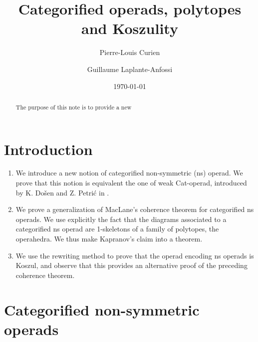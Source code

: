 \documentclass[10pt]{amsart}
\title{Categorified operads, polytopes and Koszulity}
\author{Pierre-Louis Curien}
\author{Guillaume Laplante-Anfossi}
\date{\today}
\theoremstyle{definition}
\theoremstyle{remark}
\numberwithin{equation}{section}
\newcommand{\0}{\color{blue}{\mathsf{0}}}
\begin{document}
\begin{abstract}
The purpose of this note is to provide a new 
\end{abstract}


\maketitle

\section{Introduction}

\begin{enumerate}
    \item We introduce a new notion of categorified non-symmetric (ns) operad. We prove that this notion is equivalent the one of weak Cat-operad, introduced by K. Do{\v s}en and Z. Petri{\'c} in \cite{DP15}. 

    \item We prove a generalization of MacLane's coherence theorem for categorified ns operads. We use explicitly the fact that the diagrams associated to a categorified ns operad are 1-skeletons of a family of polytopes, the operahedra. We thus make Kapranov's claim into a theorem. 
    
    \item We use the rewriting method to prove that the operad encoding ns operads is Koszul, and observe that this provides an alternative proof of the preceding coherence theorem. 

\end{enumerate}

\section{Categorified non-symmetric operads}
\end{document}
